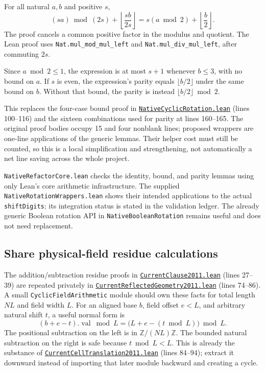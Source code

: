 \documentclass[11pt,letterpaper]{article}
\newcommand{\code}[1]{\nolinkurl{#1}}
\newcommand{\src}[2]{\href{https://github.com/VladimirReshetnikov/ProveIt/blob/60e9c5d620c6c387d932876cfa2d9376f64ea56c/Computability/DiophantineConsistency/Lean/DiophantineConsistency/#1.lean}{\nolinkurl{#1.lean}} (lines #2)}
\begin{document}
For all natural \(a,b\) and positive \(s\),
\[
\boxed{\quad
(sa)\bmod(2s)+\left\lfloor\frac{sb}{2s}\right\rfloor
=s(a\bmod2)+\left\lfloor\frac b2\right\rfloor.
\quad}
\]
The proof cancels a common positive factor in the modulus and quotient.
The Lean proof uses \code{Nat.mul_mod_mul_left} and
\code{Nat.mul_div_mul_left}, after commuting \(2s\).

Since \(a\bmod2\leq1\), the expression is at most \(s+1\) whenever
\(b\leq3\), with no bound on \(a\). If \(s\) is even, the expression's
parity equals \(\lfloor b/2\rfloor\) under the same bound on \(b\).
Without that bound, the parity is instead
\(\lfloor b/2\rfloor\bmod2\).

This replaces the four-case bound proof in
\src{NativeCyclicRotation}{100--116} and the sixteen combinations used
for parity at lines 160--165. The original proof bodies occupy 15 and
four nonblank lines; proposed wrappers are one-line applications of the
generic lemmas. Their helper cost must still be counted, so this is a
local simplification and strengthening, not automatically a net line
saving across the whole project.

\code{NativeRefactorCore.lean} checks the identity, bound, and parity
lemmas using only Lean's core arithmetic infrastructure. The supplied
\code{NativeRotationWrappers.lean} shows their intended applications to
the actual \code{shiftDigits}; its integration status is stated in the
validation ledger. The already generic Boolean rotation API in
\code{NativeBooleanRotation} remains useful and does not need replacement.

\subsection{Share physical-field residue calculations}

The addition/subtraction residue proofs in
\src{CurrentClause2011}{27--39} are repeated privately in
\src{CurrentReflectedGeometry2011}{74--86}. A small
\code{CyclicFieldArithmetic} module should own these facts for total
length \(NL\) and field width \(L\). For an aligned base \(b\), field
offset \(e<L\), and arbitrary natural shift \(t\), a useful normal form is
\[
(b+e-t).\operatorname{val}\bmod L
=\bigl(L+e-(t\bmod L)\bigr)\bmod L.
\]
The positional subtraction on the left is in \(\mathbb Z/(NL)\mathbb Z\).
The bounded natural subtraction on the right is safe because
\(t\bmod L<L\). This is already the substance of
\src{CurrentCellTranslation2011}{84--94}; extract it downward instead
of importing that later module backward and creating a cycle.
\end{document}
